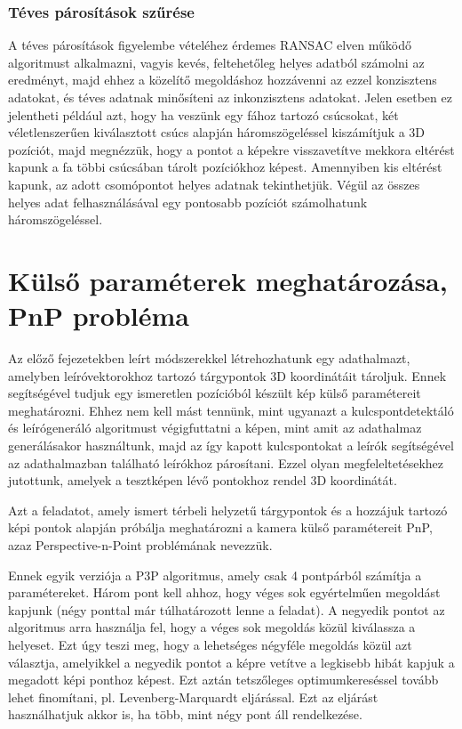 \documentclass{article}
\begin{document}
	\subsubsection{Téves párosítások szűrése}
	A téves párosítások figyelembe vételéhez érdemes RANSAC elven működő algoritmust alkalmazni, vagyis kevés, feltehetőleg helyes adatból számolni az eredményt, majd ehhez a közelítő megoldáshoz hozzávenni az ezzel konzisztens adatokat, és téves adatnak minősíteni az inkonzisztens adatokat. Jelen esetben ez jelentheti például azt, hogy ha veszünk egy fához tartozó csúcsokat, két véletlenszerűen kiválasztott csúcs alapján háromszögeléssel kiszámítjuk a 3D pozíciót, majd megnézzük, hogy a pontot a képekre visszavetítve mekkora eltérést kapunk a fa többi csúcsában tárolt pozíciókhoz képest. Amennyiben kis eltérést kapunk, az adott csomópontot helyes adatnak tekinthetjük. Végül az összes helyes adat felhasználásával egy pontosabb pozíciót számolhatunk háromszögeléssel.
	
	\section{Külső paraméterek meghatározása, PnP probléma}
	Az előző fejezetekben leírt módszerekkel létrehozhatunk egy adathalmazt, amelyben leíróvektorokhoz tartozó tárgypontok 3D koordinátáit tároljuk. Ennek segítségével tudjuk egy ismeretlen pozícióból készült kép külső paramétereit meghatározni. Ehhez nem kell mást tennünk, mint ugyanazt a kulcspontdetektáló és leírógeneráló algoritmust végigfuttatni a képen, mint amit az adathalmaz generálásakor használtunk, majd az így kapott kulcspontokat a leírók segítségével az adathalmazban található leírókhoz párosítani. Ezzel olyan megfeleltetésekhez jutottunk, amelyek a tesztképen lévő pontokhoz rendel 3D koordinátát.
	
	Azt a feladatot, amely ismert térbeli helyzetű tárgypontok és a hozzájuk tartozó képi pontok alapján próbálja meghatározni a kamera külső paramétereit PnP, azaz Perspective-n-Point problémának nevezzük. 
	
Ennek egyik verziója a P3P algoritmus, amely csak 4 pontpárból számítja a paramétereket. Három pont kell ahhoz, hogy véges sok egyértelműen megoldást kapjunk (négy ponttal már túlhatározott lenne a feladat). A negyedik pontot az algoritmus arra használja fel, hogy a véges sok megoldás közül kiválassza a helyeset. Ezt úgy teszi meg, hogy a lehetséges négyféle megoldás közül azt választja, amelyikkel a negyedik pontot a képre vetítve a legkisebb hibát kapjuk a megadott képi ponthoz képest. Ezt aztán tetszőleges optimumkereséssel tovább lehet finomítani, pl. Levenberg-Marquardt eljárással. Ezt az eljárást használhatjuk akkor is, ha több, mint négy pont áll rendelkezése.
	
\end{document}

